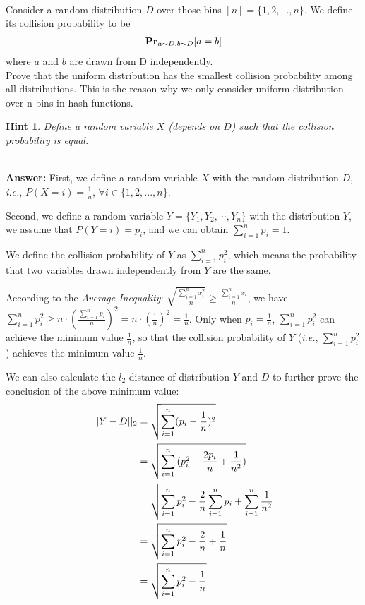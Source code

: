 \documentclass[12pt]{article}
\newcommand{\Answer}{\ \\ \textbf{Answer:} }
\newtheorem{hint}{Hint}
\def\ie{\textit{i.e.}\xspace}
\begin{document}
~\\
\begin{problem}[20 points.] Consider a random distribution $D$ over those bins $[n] = \{1, 2, ..., n\}$. We define its collision probability to be
\begin{equation}
\begin{aligned}
\mathbf{Pr}_{a \sim D, b \sim D}{[a = b]} \notag
\end{aligned}
\end{equation}
where $a$ and $b$ are drawn from D independently.  \\
Prove that the uniform distribution has the smallest collision probability among all distributions.
This is the reason why we only consider uniform distribution over n bins in hash functions.

\begin{hint}
Define a random variable $X$ (depends on $D$) such that the collision probability is equal.
\end{hint}

\Answer
First, we define a random variable $X$ with the random distribution $D$, \ie, $P(X = i) = \frac{1}{n}$, $\forall i \in \{1, 2, ..., n\}$. 

Second, we define a random variable $Y = \{Y_1, Y_2, \cdots, Y_n\}$ with the distribution $Y$, we assume that $P(Y = i) = p_i$, and we can obtain $\sum_{i=1}^{n}p_i = 1$.

We define the collision probability of $Y$ as $\sum_{i=1}^{n}p_i^2$, which means the probability that two variables drawn independently from $Y$ are the same.

According to the \textit{Average Inequality}: $\sqrt{\frac{\sum_{i=1}^{n}x_i^2}{n}} \ge \frac{\sum_{i=1}^{n}x_i}{n}$,
we have $\sum_{i=1}^{n}p_i^2 \ge n \cdot (\frac{\sum_{i=1}^{n}p_i}{n})^2 = n \cdot (\frac{1}{n})^2 = \frac{1}{n}$.
Only when $p_i = \frac{1}{n}$, $\sum_{i=1}^{n}p_i^2$ can achieve the minimum value $\frac{1}{n}$,
so that the collision probability of $Y$ (\ie, $\sum_{i=1}^{n}p_i^2$) achieves the minimum value $\frac{1}{n}$.

We can also calculate the $l_2$ distance of distribution $Y$ and $D$ to further prove the conclusion of the above minimum value:
\begin{equation}
\begin{aligned}
||Y - D||_2 &= \sqrt{\sum_{i=1}^{n}(p_i - \frac{1}{n})^2} \notag \\
&= \sqrt{\sum_{i=1}^{n}{(p_i^2 - \frac{2p_i}{n} + \frac{1}{n^2})}} \\
&= \sqrt{\sum_{i=1}^{n}p_i^2 - \frac{2}{n}\sum_{i=1}^{n}p_i + \sum_{i=1}^{n}\frac{1}{n^2}} \\
&= \sqrt{\sum_{i=1}^{n}p_i^2 - \frac{2}{n} + \frac{1}{n}} \\
&= \sqrt{\sum_{i=1}^{n}p_i^2 - \frac{1}{n}} \\
\end{aligned}
\end{equation}


\end{problem}
\end{document}
